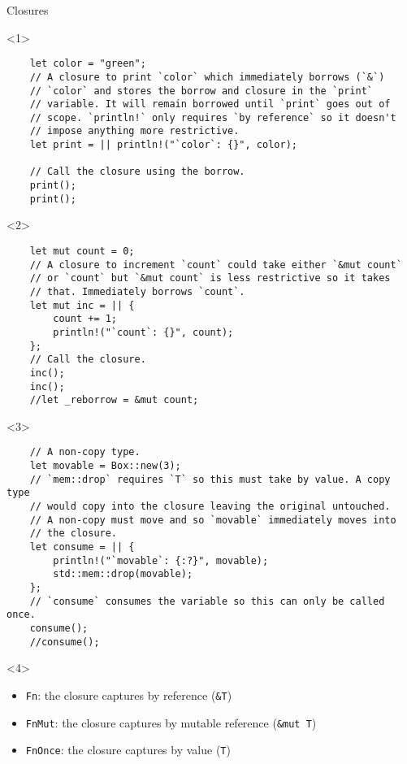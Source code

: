 \begin{frame}[fragile]{Closures}
  \begin{onlyenv}<1>
    \begin{verbatim}
    let color = "green";
    // A closure to print `color` which immediately borrows (`&`)
    // `color` and stores the borrow and closure in the `print`
    // variable. It will remain borrowed until `print` goes out of
    // scope. `println!` only requires `by reference` so it doesn't
    // impose anything more restrictive.
    let print = || println!("`color`: {}", color);

    // Call the closure using the borrow.
    print();
    print();
    \end{verbatim}
  \end{onlyenv}

  \begin{onlyenv}<2>
    \begin{verbatim}
    let mut count = 0;
    // A closure to increment `count` could take either `&mut count`
    // or `count` but `&mut count` is less restrictive so it takes
    // that. Immediately borrows `count`.
    let mut inc = || {
        count += 1;
        println!("`count`: {}", count);
    };
    // Call the closure.
    inc();
    inc();
    //let _reborrow = &mut count;
    \end{verbatim}
  \end{onlyenv}

  \begin{onlyenv}<3>
    \begin{verbatim}
    // A non-copy type.
    let movable = Box::new(3);
    // `mem::drop` requires `T` so this must take by value. A copy type
    // would copy into the closure leaving the original untouched.
    // A non-copy must move and so `movable` immediately moves into
    // the closure.
    let consume = || {
        println!("`movable`: {:?}", movable);
        std::mem::drop(movable);
    };
    // `consume` consumes the variable so this can only be called once.
    consume();
    //consume();
    \end{verbatim}
  \end{onlyenv}

  \begin{onlyenv}<4>
    \begin{itemize}
    \item \texttt{Fn}: the closure captures by reference (\texttt{\&T})
    \item \texttt{FnMut}: the closure captures by mutable reference
      (\texttt{\&mut T})
    \item \texttt{FnOnce}: the closure captures by value (\texttt{T})
    \end{itemize}
  \end{onlyenv}
\end{frame}

